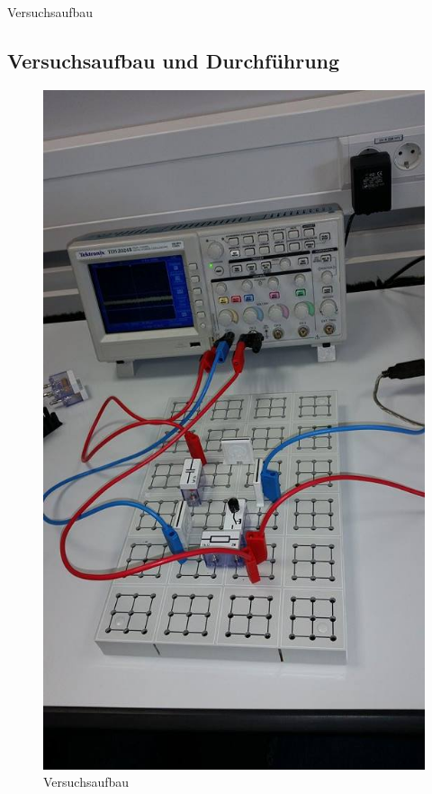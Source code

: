 \documentclass[11pt]{beamer}
\begin{document}
\begin{frame}{Versuchsaufbau}
\subsection{Versuchsaufbau und Durchführung}
\begin{figure}[hbtp]
\centering
\includegraphics[scale=0.19]{12834525_1207198235971903_753892727_n.jpg}
\caption{Versuchsaufbau}
\end{figure}
\end{frame}
\end{document}
